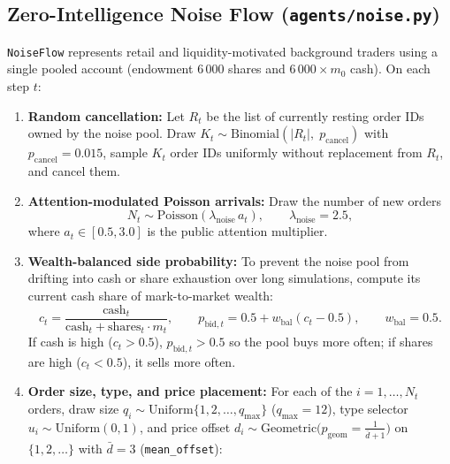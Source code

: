\documentclass[11pt,a4paper]{article}
\newcommand{\code}[1]{\texttt{#1}}
\begin{document}
\subsection{Zero-Intelligence Noise Flow (\code{agents/noise.py})}

\code{NoiseFlow} represents retail and liquidity-motivated background traders using a single pooled
account (endowment $6\,000$ shares and $6\,000 \times m_0$ cash). On each step $t$:
\begin{enumerate}[nosep]
\item \textbf{Random cancellation:} Let $R_t$ be the list of currently resting order IDs owned by the
  noise pool. Draw $K_t \sim \text{Binomial}(|R_t|,\; p_{\text{cancel}})$ with $p_{\text{cancel}} = 0.015$,
  sample $K_t$ order IDs uniformly without replacement from $R_t$, and cancel them.
\item \textbf{Attention-modulated Poisson arrivals:} Draw the number of new orders
  \begin{equation}
    N_t \sim \text{Poisson}(\lambda_{\text{noise}}\, a_t), \qquad \lambda_{\text{noise}} = 2.5,
  \end{equation}
  where $a_t \in [0.5, 3.0]$ is the public attention multiplier.
\item \textbf{Wealth-balanced side probability:} To prevent the noise pool from drifting into cash or
  share exhaustion over long simulations, compute its current cash share of mark-to-market wealth:
  \begin{equation}
    c_t = \frac{\text{cash}_t}{\text{cash}_t + \text{shares}_t \cdot m_t}, \qquad
    p_{\text{bid},t} = 0.5 + w_{\text{bal}}(c_t - 0.5), \qquad w_{\text{bal}} = 0.5.
  \end{equation}
  If cash is high ($c_t > 0.5$), $p_{\text{bid},t} > 0.5$ so the pool buys more often; if shares are high
  ($c_t < 0.5$), it sells more often.
\item \textbf{Order size, type, and price placement:} For each of the $i = 1,\dots,N_t$ orders, draw size
  $q_i \sim \text{Uniform}\{1, 2, \dots, q_{\max}\}$ ($q_{\max} = 12$), type selector
  $u_i \sim \text{Uniform}(0,1)$, and price offset
  $d_i \sim \text{Geometric}\big(p_{\text{geom}} = \frac{1}{\bar d + 1}\big)$ on $\{1,2,\dots\}$ with
  $\bar d = 3$ (\code{mean\_offset}):
  \begin{itemize}[nosep]

\end{itemize}
\end{enumerate}
\end{document}
